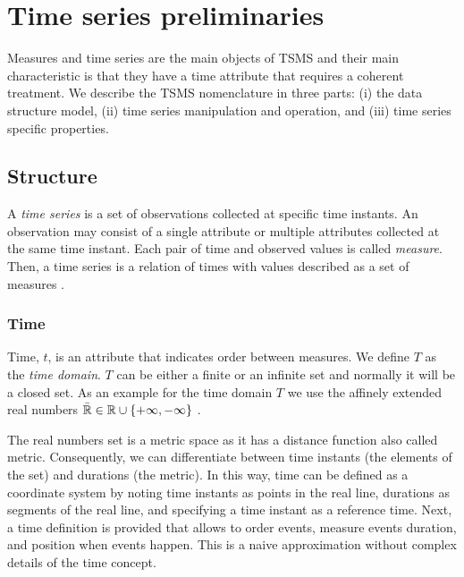 

\section{Time series preliminaries}
\label{sec:model:preliminaries}



Measures and time series are the main objects of TSMS and their main
characteristic is that they have a time attribute that requires a
coherent treatment. We describe the TSMS nomenclature in three parts:
(i) the data structure model, (ii) time series manipulation and
operation, and (iii) time series specific properties.



\subsection{Structure}


A \emph{time series} is a set of observations collected at specific
time instants. An observation may consist of a single attribute or
multiple attributes collected at the same time instant.  Each pair of
time and observed values is called \emph{measure}. Then, a time series
is a relation of times with values described as a set of measures .





\subsubsection{Time}

Time, $t$, is an attribute that indicates order between measures. We define
$T$ as the \emph{time domain}. $T$ can be either a finite or an infinite set
and normally it will be a closed set. As an example for the time
domain $T$ we use the affinely extended real numbers $\bar{\mathbb{R}} \in \mathbb{R} \cup
\{+\infty,-\infty\}$ \cite{cantrell:extendedreal}.

The real numbers set is a metric space as it has a distance function
also called metric. Consequently, we can differentiate between time
instants (the elements of the set) and durations (the metric). In this
way, time can be defined as a coordinate system
\cite{iep:time-supplement,kopetz11:realtime} by noting time instants
as points in the real line, durations as segments of the real line,
and specifying a time instant as a reference time. Next, a time
definition is provided that allows to order events, measure events
duration, and position when events happen. This is a naive
approximation without complex details of the time concept.

